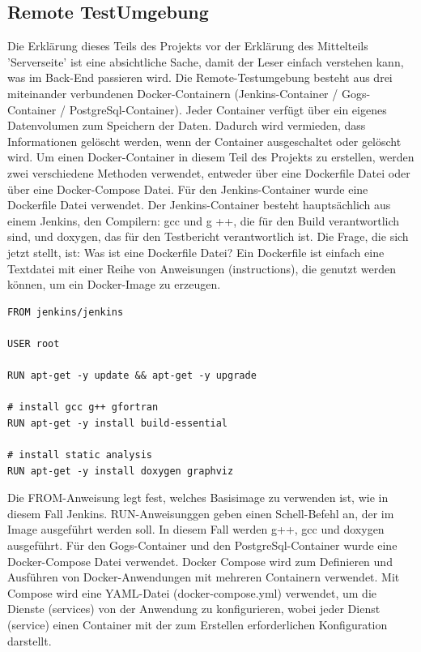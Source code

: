 \documentclass[a4paper,12pt,oneside]{book}
\begin{document}
\subsection{Remote TestUmgebung}
Die Erklärung dieses Teils des Projekts vor der Erklärung des Mittelteils 'Serverseite' ist eine absichtliche Sache, damit der Leser einfach verstehen kann, was im Back-End passieren wird.
\newline
Die Remote-Testumgebung besteht aus drei miteinander verbundenen Docker-Containern (Jenkins-Container / Gogs-Container / PostgreSql-Container). Jeder Container verfügt über ein eigenes Datenvolumen zum Speichern der Daten. Dadurch wird vermieden, dass Informationen gelöscht werden, wenn der Container ausgeschaltet oder gelöscht wird.
\newline
Um einen Docker-Container in diesem Teil des Projekts zu erstellen, werden zwei verschiedene Methoden verwendet, entweder über eine Dockerfile Datei oder über eine Docker-Compose Datei.
\newline
Für den Jenkins-Container wurde eine Dockerfile Datei verwendet. Der Jenkins-Container besteht hauptsächlich aus einem Jenkins, den Compilern: gcc und g ++, die für den Build verantwortlich sind, und doxygen, das für den Testbericht verantwortlich ist.
\newline
Die Frage, die sich jetzt stellt, ist: Was ist eine Dockerfile Datei?
\newline
Ein Dockerfile ist einfach eine Textdatei mit einer Reihe von Anweisungen (instructions), die genutzt werden können, um ein Docker-Image zu erzeugen.
\newline
\begin{lstlisting}[caption=Dockerfile - jenkins]
FROM jenkins/jenkins

USER root

RUN apt-get -y update && apt-get -y upgrade

# install gcc g++ gfortran
RUN apt-get -y install build-essential

# install static analysis
RUN apt-get -y install doxygen graphviz
\end{lstlisting}
Die FROM-Anweisung legt fest, welches Basisimage zu verwenden ist, wie in diesem Fall Jenkins. RUN-Anweisunggen geben einen Schell-Befehl an, der im Image ausgeführt werden soll. In diesem Fall werden g++, gcc und doxygen ausgeführt.
\newline
Für den Gogs-Container und den PostgreSql-Container wurde eine Docker-Compose Datei verwendet.
Docker Compose wird zum Definieren und Ausführen von Docker-Anwendungen mit mehreren Containern verwendet. Mit Compose wird eine YAML-Datei (docker-compose.yml) verwendet, um die Dienste (services) von der Anwendung zu konfigurieren, wobei jeder Dienst (service) einen Container mit der zum Erstellen erforderlichen Konfiguration darstellt.
\end{document}
